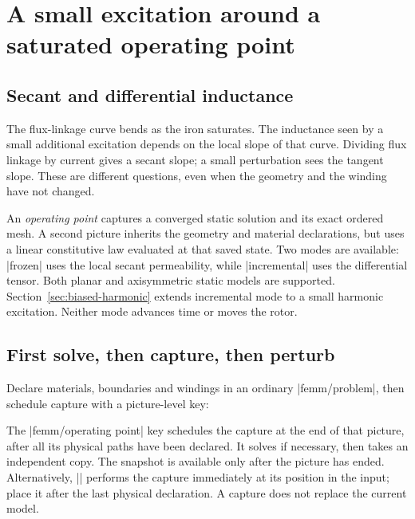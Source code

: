 \section{A small excitation around a saturated operating point}
\label{sec:operating}

\subsection{Secant and differential inductance}
The flux-linkage curve bends as the iron saturates. The inductance seen
by a small additional excitation depends on the local slope of that curve.
Dividing flux linkage by current gives a secant slope; a small perturbation
sees the tangent slope. These are different questions, even when the geometry
and the winding have not changed.

An \emph{operating point} captures a converged static solution and its exact
ordered mesh. A second picture inherits the geometry and material declarations,
but uses a linear constitutive law evaluated at that saved state. Two modes
are available: |frozen| uses the local secant permeability, while
|incremental| uses the differential tensor. Both planar and axisymmetric
static models are supported. Section~\ref{sec:biased-harmonic} extends incremental
mode to a small harmonic excitation. Neither mode advances time or moves the rotor.

\subsection{First solve, then capture, then perturb}
Declare materials, boundaries and windings in an ordinary |femm/problem|,
then schedule capture with a picture-level key:
\begin{codeexample}
\end{codeexample}
The |femm/operating point| key schedules the capture at the end of that
picture, after all its physical paths have been declared. It solves if
necessary, then takes an independent copy. The snapshot is available only
after the picture has ended. Alternatively,
|\femmoperatingpoint[name=bias]| performs the capture immediately at its
position in the input; place it after the last physical declaration.
A capture does not replace the current model.


